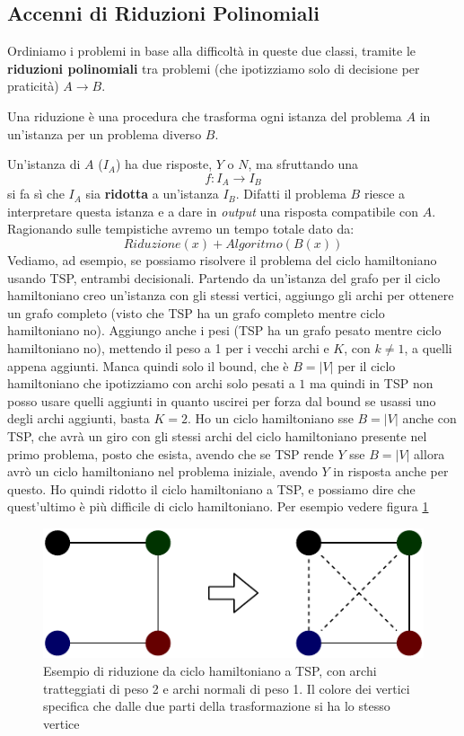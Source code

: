 \subsection{Accenni di Riduzioni Polinomiali}
Ordiniamo i problemi in base alla difficoltà in queste due classi, tramite le
\textbf{riduzioni polinomiali} tra problemi (che ipotizziamo solo di decisione per praticità) $A\to B$.
\begin{definizione}
  Una riduzione è una procedura che trasforma ogni istanza del problema $A$ in un'istanza per un problema diverso $B$.
\end{definizione}
Un'istanza di $A$ ($I_A$) ha due risposte, $Y$ o $N$, ma sfruttando una \[f:I_A\to I_B\] si fa sì che $I_A$ sia \textbf{ridotta} a un'istanza $I_B$. Difatti il problema $B$ riesce a interpretare questa istanza e a dare in \textit{output} una risposta compatibile con $A$.\\ Ragionando sulle tempistiche avremo un tempo totale dato da:
\[Riduzione(x) + Algoritmo(B(x))\]
Vediamo, ad esempio, se possiamo risolvere il problema del ciclo hamiltoniano
usando TSP, entrambi decisionali. Partendo da un'istanza del grafo per il ciclo
hamiltoniano creo un'istanza con gli stessi vertici, aggiungo gli archi per
ottenere un grafo completo (visto che TSP ha un grafo completo mentre ciclo
hamiltoniano no). Aggiungo anche i pesi (TSP ha un grafo pesato mentre ciclo
hamiltoniano no), mettendo il peso a 1 per i vecchi archi
e $K$, con $k\neq 1$, a quelli appena aggiunti. Manca quindi
solo il bound, che è $B=|V|$ per il ciclo hamiltoniano che ipotizziamo con archi
solo pesati a $1$ ma quindi in TSP non posso usare quelli aggiunti in quanto
uscirei per forza dal bound se usassi uno degli archi aggiunti, basta $K=2$. Ho
un ciclo hamiltoniano sse $B=|V|$ anche con TSP, che avrà un giro con gli stessi
archi del ciclo hamiltoniano presente nel primo problema, posto che esista,
avendo che se TSP rende $Y$ sse $B=|V|$ allora avrò un ciclo hamiltoniano nel
problema iniziale, avendo $Y$ in risposta anche per questo. Ho quindi ridotto il
ciclo hamiltoniano a TSP, e possiamo dire che quest'ultimo è più difficile di
ciclo hamiltoniano. Per esempio vedere figura \ref{fig:htsp}
\begin{figure}
  \centering
  \includegraphics[scale = 0.9]{img/rid.pdf}
  \caption{Esempio di riduzione da ciclo hamiltoniano a TSP, con archi
    tratteggiati di peso 2 e archi normali di peso 1. Il colore dei vertici
    specifica che dalle due parti della trasformazione si ha lo stesso vertice}
  \label{fig:htsp}
\end{figure}
